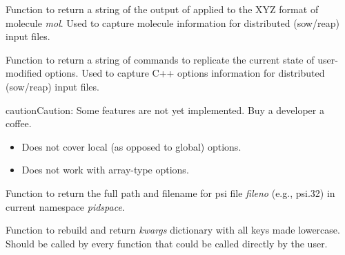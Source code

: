 \documentclass[letterpaper,10pt,english]{sphinxmanual}
\begin{document}

\begin{fulllineitems}
\label{index:procutil.format_molecule_for_input}
Function to return a string of the output of
{\hyperref[index:input.process_input]{}} applied to the XYZ
format of molecule \emph{mol}. Used to capture molecule
information for distributed (sow/reap) input files.

\end{fulllineitems}


\begin{fulllineitems}
\label{index:procutil.format_options_for_input}
Function to return a string of commands to replicate the
current state of user-modified options. Used to capture C++
options information for distributed (sow/reap) input files.

\begin{notice}{caution}{Caution:}
Some features are not yet implemented. Buy a developer a coffee.
\begin{itemize}
\item {} 
Does not cover local (as opposed to global) options.

\item {} 
Does not work with array-type options.

\end{itemize}
\end{notice}

\end{fulllineitems}


\begin{fulllineitems}
\label{index:procutil.get_psifile}
Function to return the full path and filename for psi file
\emph{fileno} (e.g., psi.32) in current namespace \emph{pidspace}.

\end{fulllineitems}


\begin{fulllineitems}
\label{index:procutil.kwargs_lower}
Function to rebuild and return \emph{kwargs} dictionary
with all keys made lowercase. Should be called by every
function that could be called directly by the user.

\end{fulllineitems}
\end{document}
